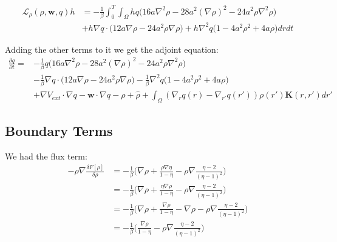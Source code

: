 \documentclass[11pt, a4paper]{article}
\theoremstyle{definition}
\newcommand{\w}{\mathbf{w}}
\newcommand{\K}{\mathbf{K}}
\begin{document}
\begin{align*}
\mathcal{L}_\rho(\rho, \w, q) h &= -\frac{1}{\beta}  \int_0^T \int_\Omega h q \bigg(16 a\nabla^2 \rho -28a^2  \left(\nabla \rho\right)^2   - 24 a^2  \rho \nabla^2 \rho  
\bigg)\\
&+ h \nabla q \cdot \bigg( 12a \nabla \rho - 24 a^2 \rho \nabla \rho  \bigg) + h \nabla^2 q \bigg( 1  - 4a^2  \rho^2  + 4 a   \rho  \bigg) dr dt
\end{align*}


Adding the other terms to it we get the adjoint equation:
\begin{align*}
\frac{\partial q}{\partial t} =& -\frac{1}{\beta} q \bigg(16 a\nabla^2 \rho -28a^2  \left(\nabla \rho\right)^2   - 24 a^2  \rho \nabla^2 \rho  
\bigg)\\
&-\frac{1}{\beta} \nabla q \cdot \bigg( 12a \nabla \rho - 24 a^2 \rho \nabla \rho  \bigg) -\frac{1}{\beta}  \nabla^2 q \bigg( 1  - 4a^2  \rho^2  + 4 a   \rho  \bigg) \\
& + \nabla V_{ext} \cdot \nabla q - \w \cdot \nabla q - \rho + \widehat \rho + \int_\Omega ( \nabla_r q(r) - \nabla_{r'} q(r')) \rho(r') \K(r,r') dr'
\end{align*}


\subsection{Boundary Terms}
We had the flux term:
\begin{align*}
-\rho \nabla \frac{\delta F[\rho]}{\delta \rho} &= -\frac{1}{\beta} \bigg( \nabla \rho +   \frac{\rho \nabla \eta}{1 - \eta} - \rho \nabla\frac{\eta - 2}{(\eta - 1)^2}  \bigg)\\
&=- \frac{1}{\beta} \bigg( \nabla \rho +   \frac{\eta\nabla \rho}{1 - \eta} - \rho \nabla\frac{\eta - 2}{(\eta - 1)^2}  \bigg)\\
&= -\frac{1}{\beta} \bigg( \nabla \rho + \frac{\nabla \rho}{1 - \eta} - \nabla \rho - \rho \nabla\frac{\eta - 2}{(\eta - 1)^2}  \bigg)\\
&= -\frac{1}{\beta} \bigg(  \frac{\nabla \rho}{1 - \eta}  - \rho \nabla\frac{\eta - 2}{(\eta - 1)^2}  \bigg)
\end{align*}
\end{document}
